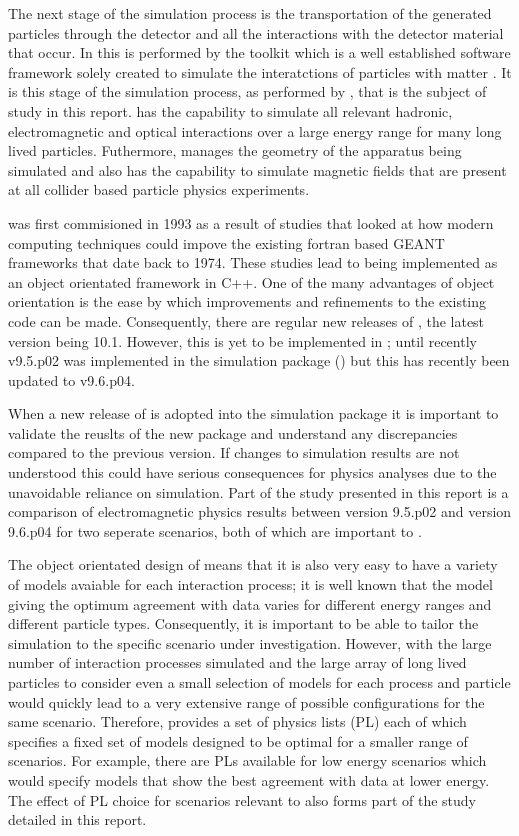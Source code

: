 The next stage of the simulation process is the transportation of the generated particles through the detector and all the interactions with the detector material that occur.  In \lhcb this is performed by the \geant toolkit which is a well established software framework solely created to simulate the interatctions of particles with matter \cite{Agostinelli:2002hh}.  It is this stage of the simulation process, as performed by \geant, that is the subject of study in this report.  \geant has the capability to simulate all relevant hadronic, electromagnetic and optical interactions over a large energy range for many long lived particles. Futhermore, \geant manages the geometry of the apparatus being simulated and also has the capability to simulate magnetic fields that are present at all collider based particle physics experiments.

\geant was first commisioned in 1993 as a result of studies that looked at how modern computing techniques could impove the existing fortran based GEANT frameworks that date back to 1974\cite{Agostinelli:2002hh,Brun:118715}.  These studies lead to \geant being implemented as an object orientated framework in C++.  One of the many advantages of object orientation is the ease by which improvements and refinements to the existing code can be made.  Consequently, there are regular new releases of \geant, the latest version being 10.1\cite{g410.1rn}. However, this is yet to be implemented in \lhcb; until recently \geant v9.5.p02 was implemented in the \lhcb simulation package (\gauss) but this has recently been updated to v9.6.p04.

When a new release of \geant is adopted into the \lhcb simulation package it is important to validate the reuslts of the new package and understand any discrepancies compared to the previous version.  If changes to simulation results are not understood this could have serious consequences for physics analyses due to the unavoidable reliance on simulation.  Part of the study presented in this report is a comparison of electromagnetic physics results between \geant version 9.5.p02 and version 9.6.p04 for two seperate scenarios, both of which are important to \lhcb.

The object orientated design of \geant means that it is also very easy to have a variety of models avaiable for each interaction process; it is well known that the model giving the optimum agreement with data varies for different energy ranges and different particle types.  Consequently, it is important to be able to tailor the simulation to the specific scenario under investigation.  However, with the large number of interaction processes simulated and the large array of long lived particles to consider even a small selection of models for each process and particle would quickly lead to a very extensive range of possible configurations for the same scenario.  Therefore, \geant provides a set of physics lists (PL) each of which specifies a fixed set of models designed to be optimal for a smaller range of scenarios.  For example, there are PLs available for low energy scenarios which would specify models that show the best agreement with data at lower energy.  The effect of PL choice for scenarios relevant to \lhcb also forms part of the study detailed in this report.

